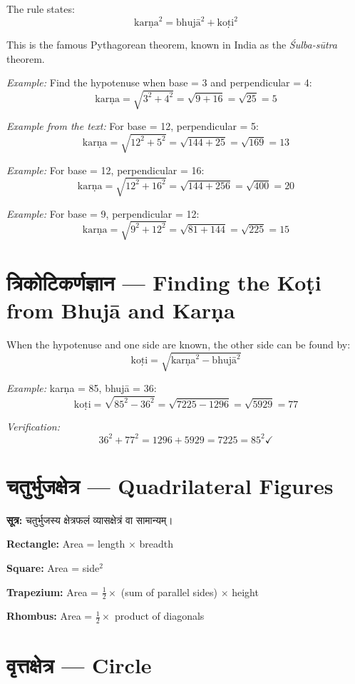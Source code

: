 \documentclass[11pt,a4paper]{book}
\newenvironment{sanskritverse}{
  \begin{center}
  \begin{minipage}{0.92\textwidth}
  \devanagarifont
  \centering
}{
  \end{minipage}
  \end{center}
  \vspace{0.5em}
}
\begin{document}
The rule states:
\[
\text{karṇa}^2 = \text{bhujā}^2 + \text{koṭi}^2
\]

This is the famous Pythagorean theorem, known in India as the \textit{Śulba-sūtra} theorem.

\textit{Example:} Find the hypotenuse when base = 3 and perpendicular = 4:
\[
\text{karṇa} = \sqrt{3^2 + 4^2} = \sqrt{9 + 16} = \sqrt{25} = 5
\]

\textit{Example from the text:} For base = 12, perpendicular = 5:
\[
\text{karṇa} = \sqrt{12^2 + 5^2} = \sqrt{144 + 25} = \sqrt{169} = 13
\]

\textit{Example:} For base = 12, perpendicular = 16:
\[
\text{karṇa} = \sqrt{12^2 + 16^2} = \sqrt{144 + 256} = \sqrt{400} = 20
\]

\textit{Example:} For base = 9, perpendicular = 12:
\[
\text{karṇa} = \sqrt{9^2 + 12^2} = \sqrt{81 + 144} = \sqrt{225} = 15
\]

\section{त्रिकोटिकर्णज्ञान — Finding the Koṭi from Bhujā and Karṇa}

When the hypotenuse and one side are known, the other side can be found by:
\[
\text{koṭi} = \sqrt{\text{karṇa}^2 - \text{bhujā}^2}
\]

\textit{Example:} karṇa = 85, bhujā = 36:
\[
\text{koṭi} = \sqrt{85^2 - 36^2} = \sqrt{7225 - 1296} = \sqrt{5929} = 77
\]

\textit{Verification:}
\[
36^2 + 77^2 = 1296 + 5929 = 7225 = 85^2 \checkmark
\]

\section{चतुर्भुजक्षेत्र — Quadrilateral Figures}

\begin{sanskritverse}
\textbf{सूत्र:} चतुर्भुजस्य क्षेत्रफलं व्यासक्षेत्रं वा सामान्यम्।
\end{sanskritverse}

\textbf{Rectangle:} Area = length $\times$ breadth

\textbf{Square:} Area = side$^2$

\textbf{Trapezium:} Area = $\frac{1}{2} \times$ (sum of parallel sides) $\times$ height

\textbf{Rhombus:} Area = $\frac{1}{2} \times$ product of diagonals

\section{वृत्तक्षेत्र — Circle}
\end{document}
